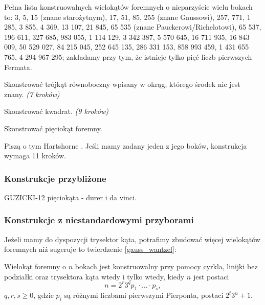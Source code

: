 Pełna lista konstruowalnych wielokątów foremnych o nieparzyście wielu bokach to: 3, 5, 15 (znane starożytnym), 17, 51, 85, 255 (znane Gaussowi), 257, 771, 1 285, 3 855, 4 369, 13 107, 21 845, 65 535 (znane Pauckerowi/Richelotowi), 65 537, 196 611, 327 685, 983 055, 1 114 129, 3 342 387, 5 570 645, 16 711 935, 16 843 009, 50 529 027, 84 215 045, 252 645 135, 286 331 153, 858 993 459, 1 431 655 765, 4 294 967 295; zakładamy przy tym, że istnieje tylko pięć liczb pierwszych Fermata.


\begin{problem}
    Skonstrować trójkąt równoboczny wpisany w okrąg, którego środek nie jest znany. \hfill \emph{(7 kroków)}
\end{problem}

\begin{problem}
    Skonstrować kwadrat. \hfill \emph{(9 kroków)}
\end{problem}

\begin{problem}
    Skonstrować pięciokąt foremny.
\end{problem}

Piszą o tym Hartshorne \cite[s. 45-49]{hartshorne2000}.
Jeśli mamy zadany jeden z jego boków, konstrukcja wymaga 11 kroków. %

\subsubsection{Konstrukcje przybliżone}
GUZICKI-12 pięciokąta - durer i da vinci.

\subsubsection{Konstrukcje z niestandardowymi przyborami}
Jeżeli mamy do dyspozycji trysektor kąta, potrafimy zbudować więcej wielokątów foremnych niż sugeruje to twierdzenie \ref{gauss_wantzel}:

\begin{proposition}
    Wielokąt foremny o $n$ bokach jest konstruowalny przy pomocy cyrkla, linijki bez podziałki oraz trysektora kąta wtedy i tylko wtedy, kiedy $n$ jest postaci
    \begin{equation}
        n = 2^r 3^q p_1 \cdot \ldots \cdot p_s,
    \end{equation}
    $q, r, s \ge 0$, gdzie $p_i$ są różnymi liczbami pierwszymi Pierponta, postaci $2^t3^u + 1$.
\end{proposition}

